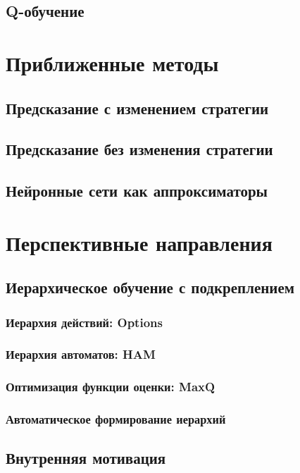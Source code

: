\documentclass[11pt]{memoir}
\begin{document}
		\section{Q-обучение}
	
	\chapter{Приближенные методы}
		\section{Предсказание с изменением стратегии}
		
		\section{Предсказание без изменения стратегии}
		
		\section{Нейронные сети как аппроксиматоры}
	
	\chapter{Перспективные направления}
	
		\section{Иерархическое обучение с подкреплением}
			\subsection{Иерархия действий: Options}
			
			\subsection{Иерархия автоматов: HAM}
			
			\subsection{Оптимизация функции оценки: MaxQ}
			
			\subsection{Автоматическое формирование иерархий}
		\section{Внутренняя мотивация}
		
\end{document}

